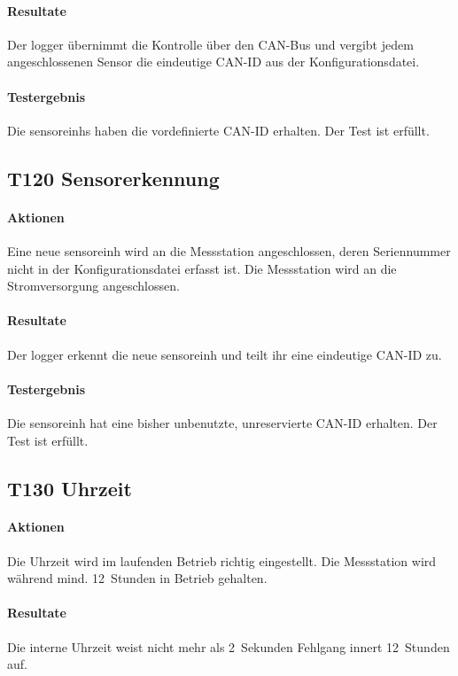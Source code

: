 \paragraph{Resultate} Der \gls{logger} übernimmt die Kontrolle über den CAN-Bus und vergibt jedem angeschlossenen Sensor die eindeutige CAN-ID aus der Konfigurationsdatei.

\paragraph{Testergebnis} Die \glspl{sensoreinh} haben die vordefinierte CAN-ID erhalten. Der Test ist erfüllt.

\subsection{T120 Sensorerkennung}
\paragraph{Aktionen} Eine neue \gls{sensoreinh} wird an die Messstation angeschlossen, deren Seriennummer nicht in der Konfigurationsdatei erfasst ist. Die Messstation wird an die Stromversorgung angeschlossen.

\paragraph{Resultate} Der \gls{logger} erkennt die neue \gls{sensoreinh} und teilt ihr eine eindeutige CAN-ID zu.

\paragraph{Testergebnis} Die \gls{sensoreinh} hat eine bisher unbenutzte, unreservierte CAN-ID erhalten. Der Test ist erfüllt.

\subsection{T130 Uhrzeit}
\paragraph{Aktionen} Die Uhrzeit wird im laufenden Betrieb richtig eingestellt. Die Messstation wird während mind. 12~Stunden in Betrieb gehalten.

\paragraph{Resultate} Die interne Uhrzeit weist nicht mehr als 2~Sekunden Fehlgang innert 12~Stunden auf.


